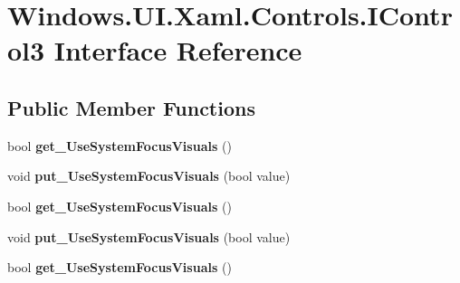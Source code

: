 \hypertarget{interface_windows_1_1_u_i_1_1_xaml_1_1_controls_1_1_i_control3}{}\section{Windows.\+U\+I.\+Xaml.\+Controls.\+I\+Control3 Interface Reference}
\label{interface_windows_1_1_u_i_1_1_xaml_1_1_controls_1_1_i_control3}
\subsection*{Public Member Functions}
\begin{DoxyCompactItemize}
\item 
\mbox{\label{interface_windows_1_1_u_i_1_1_xaml_1_1_controls_1_1_i_control3_aa47f942ff2b73dce0f3e647ba53bdc5f}} 
bool {\bfseries get\+\_\+\+Use\+System\+Focus\+Visuals} ()
\item 
\mbox{\label{interface_windows_1_1_u_i_1_1_xaml_1_1_controls_1_1_i_control3_a996aa5f650370b03c915133cfc32fdfe}} 
void {\bfseries put\+\_\+\+Use\+System\+Focus\+Visuals} (bool value)
\item 
\mbox{\label{interface_windows_1_1_u_i_1_1_xaml_1_1_controls_1_1_i_control3_aa47f942ff2b73dce0f3e647ba53bdc5f}} 
bool {\bfseries get\+\_\+\+Use\+System\+Focus\+Visuals} ()
\item 
\mbox{\label{interface_windows_1_1_u_i_1_1_xaml_1_1_controls_1_1_i_control3_a996aa5f650370b03c915133cfc32fdfe}} 
void {\bfseries put\+\_\+\+Use\+System\+Focus\+Visuals} (bool value)
\item 
\mbox{\label{interface_windows_1_1_u_i_1_1_xaml_1_1_controls_1_1_i_control3_aa47f942ff2b73dce0f3e647ba53bdc5f}} 
bool {\bfseries get\+\_\+\+Use\+System\+Focus\+Visuals} ()
\item 
\mbox{\label{interface_windows_1_1_u_i_1_1_xaml_1_1_controls_1_1_i_control3_a996aa5f650370b03c915133cfc32fdfe}} 

\end{DoxyCompactItemize}
